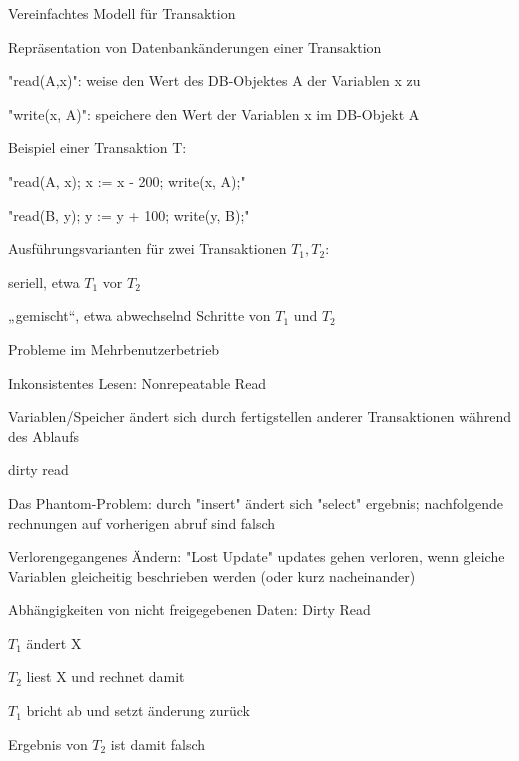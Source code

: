 \documentclass[a4paper]{article}
\begin{document}
\begin{multicols}{3}
\begin{itemize*}
    Vereinfachtes Modell für Transaktion
    \begin{itemize*}
        \item Repräsentation von Datenbankänderungen einer Transaktion
        \begin{itemize*}
            \item "read(A,x)": weise den Wert des DB-Objektes A der Variablen x zu
            \item "write(x, A)": speichere den Wert der Variablen x im DB-Objekt A
        \end{itemize*}
        \item Beispiel einer Transaktion T:
        \begin{itemize*}
            \item "read(A, x); x := x - 200; write(x, A);"
            \item "read(B, y); y := y + 100; write(y, B);"
        \end{itemize*}
        \item Ausführungsvarianten für zwei Transaktionen $T_1 , T_2$:
        \begin{itemize*}
            \item seriell, etwa $T_1$ vor $T_2$
            \item „gemischt“, etwa abwechselnd Schritte von $T_1$ und $T_2$
        \end{itemize*}
        \item Probleme im Mehrbenutzerbetrieb
        \begin{itemize*}
            \item Inkonsistentes Lesen: Nonrepeatable Read
            \item Variablen/Speicher ändert sich durch fertigstellen anderer Transaktionen während des Ablaufs
            \item dirty read
            \item Das Phantom-Problem: durch "insert" ändert sich "select" ergebnis; nachfolgende rechnungen auf vorherigen abruf sind falsch
            \item Verlorengegangenes Ändern: "Lost Update" updates gehen verloren, wenn gleiche Variablen gleicheitig beschrieben werden (oder kurz nacheinander)
        \end{itemize*}
    \end{itemize*}

    Abhängigkeiten von nicht freigegebenen Daten: Dirty Read
    \begin{itemize*}
        \item $T_1$ ändert X
        \item $T_2$ liest X und rechnet damit
        \item $T_1$ bricht ab und setzt änderung zurück
        \item Ergebnis von $T_2$ ist damit falsch
    \end{itemize*}


\end{itemize*}
\end{multicols}
\end{document}
